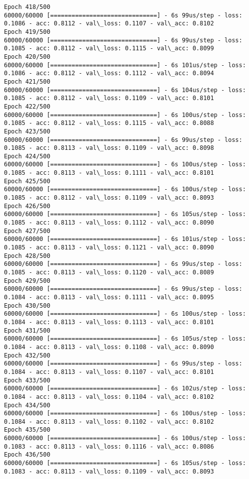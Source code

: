 \documentclass[11pt]{article}
\begin{document}
\begin{Verbatim}[commandchars=\\\{\}]
Epoch 418/500
60000/60000 [==============================] - 6s 99us/step - loss: 0.1086 - acc: 0.8112 - val\_loss: 0.1107 - val\_acc: 0.8102
Epoch 419/500
60000/60000 [==============================] - 6s 99us/step - loss: 0.1085 - acc: 0.8112 - val\_loss: 0.1115 - val\_acc: 0.8099
Epoch 420/500
60000/60000 [==============================] - 6s 101us/step - loss: 0.1086 - acc: 0.8112 - val\_loss: 0.1112 - val\_acc: 0.8094
Epoch 421/500
60000/60000 [==============================] - 6s 104us/step - loss: 0.1085 - acc: 0.8112 - val\_loss: 0.1109 - val\_acc: 0.8101
Epoch 422/500
60000/60000 [==============================] - 6s 100us/step - loss: 0.1085 - acc: 0.8112 - val\_loss: 0.1115 - val\_acc: 0.8088
Epoch 423/500
60000/60000 [==============================] - 6s 99us/step - loss: 0.1085 - acc: 0.8113 - val\_loss: 0.1109 - val\_acc: 0.8098
Epoch 424/500
60000/60000 [==============================] - 6s 100us/step - loss: 0.1085 - acc: 0.8113 - val\_loss: 0.1111 - val\_acc: 0.8101
Epoch 425/500
60000/60000 [==============================] - 6s 100us/step - loss: 0.1085 - acc: 0.8112 - val\_loss: 0.1109 - val\_acc: 0.8093
Epoch 426/500
60000/60000 [==============================] - 6s 105us/step - loss: 0.1085 - acc: 0.8113 - val\_loss: 0.1112 - val\_acc: 0.8090
Epoch 427/500
60000/60000 [==============================] - 6s 101us/step - loss: 0.1085 - acc: 0.8113 - val\_loss: 0.1121 - val\_acc: 0.8090
Epoch 428/500
60000/60000 [==============================] - 6s 99us/step - loss: 0.1085 - acc: 0.8113 - val\_loss: 0.1120 - val\_acc: 0.8089
Epoch 429/500
60000/60000 [==============================] - 6s 99us/step - loss: 0.1084 - acc: 0.8113 - val\_loss: 0.1111 - val\_acc: 0.8095
Epoch 430/500
60000/60000 [==============================] - 6s 100us/step - loss: 0.1084 - acc: 0.8113 - val\_loss: 0.1113 - val\_acc: 0.8101
Epoch 431/500
60000/60000 [==============================] - 6s 105us/step - loss: 0.1084 - acc: 0.8113 - val\_loss: 0.1108 - val\_acc: 0.8090
Epoch 432/500
60000/60000 [==============================] - 6s 99us/step - loss: 0.1084 - acc: 0.8113 - val\_loss: 0.1107 - val\_acc: 0.8101
Epoch 433/500
60000/60000 [==============================] - 6s 102us/step - loss: 0.1084 - acc: 0.8113 - val\_loss: 0.1104 - val\_acc: 0.8102
Epoch 434/500
60000/60000 [==============================] - 6s 100us/step - loss: 0.1084 - acc: 0.8113 - val\_loss: 0.1102 - val\_acc: 0.8102
Epoch 435/500
60000/60000 [==============================] - 6s 100us/step - loss: 0.1083 - acc: 0.8113 - val\_loss: 0.1116 - val\_acc: 0.8086
Epoch 436/500
60000/60000 [==============================] - 6s 105us/step - loss: 0.1083 - acc: 0.8113 - val\_loss: 0.1109 - val\_acc: 0.8093

\end{Verbatim}
\end{document}
